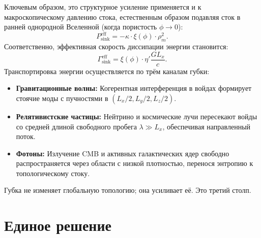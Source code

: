\documentclass[12pt,a4paper]{article}
\begin{document}
Ключевым образом, это структурное усиление применяется и к макроскопическому давлению стока, естественным образом подавляя сток в ранней однородной Вселенной (когда пористость $\phi \to 0$):
\begin{equation}
P_{\text{sink}}^{\text{eff}} = -\kappa \cdot \xi(\phi) \cdot \rho_m^2.
\end{equation}
Соответственно, эффективная скорость диссипации энергии становится:
\begin{equation}
\Gamma_{\text{sink}}^{\text{eff}} = \xi(\phi) \cdot \eta' \frac{G L_x}{c}.
\end{equation}
Транспортировка энергии осуществляется по трём каналам губки:
\begin{itemize}
    \item \textbf{Гравитационные волны:} Когерентная интерференция в войдах формирует стоячие моды с пучностями в $(L_x/2, L_y/2, L_z/2)$.
    \item \textbf{Релятивистские частицы:} Нейтрино и космические лучи пересекают войды со средней длиной свободного пробега $\lambda \gg L_x$, обеспечивая направленный поток.
    \item \textbf{Фотоны:} Излучение CMB и активных галактических ядер свободно распространяется через области с низкой плотностью, перенося энтропию к топологическому стоку.
\end{itemize}
Губка не изменяет глобальную топологию; она усиливает её. Это третий столп.

\section{Единое решение}
\end{document}
